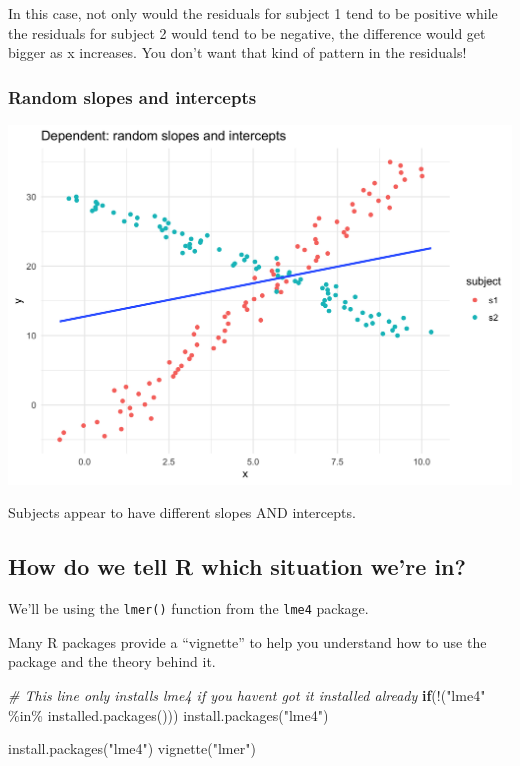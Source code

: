 \documentclass[
  openany]{book}
\newenvironment{Shaded}{\begin{snugshade}}{\end{snugshade}}
\newcommand{\CommentTok}[1]{\textcolor[rgb]{0.56,0.35,0.01}{\textit{#1}}}
\newcommand{\ControlFlowTok}[1]{\textcolor[rgb]{0.13,0.29,0.53}{\textbf{#1}}}
\newcommand{\FunctionTok}[1]{\textcolor[rgb]{0.00,0.00,0.00}{#1}}
\newcommand{\NormalTok}[1]{#1}
\newcommand{\SpecialCharTok}[1]{\textcolor[rgb]{0.00,0.00,0.00}{#1}}
\newcommand{\StringTok}[1]{\textcolor[rgb]{0.31,0.60,0.02}{#1}}
\begin{document}
In this case, not only would the residuals for subject 1 tend to be positive while the residuals for subject 2 would tend to be negative, the difference would get bigger as x increases. You don't want that kind of pattern in the residuals!

\hypertarget{random-slopes-and-intercepts}{%
\subsubsection{Random slopes and intercepts}\label{random-slopes-and-intercepts}}

\begin{center}\includegraphics[width=1\linewidth]{images/m3/rand_slope_int} \end{center}

Subjects appear to have different slopes AND intercepts.

\hypertarget{how-do-we-tell-r-which-situation-were-in}{%
\subsection{How do we tell R which situation we're in?}\label{how-do-we-tell-r-which-situation-were-in}}

We'll be using the \texttt{lmer()} function from the \texttt{lme4} package.

Many R packages provide a ``vignette'' to help you understand how to use the package and the theory behind it.

\begin{Shaded}
\begin{Highlighting}[]
\CommentTok{\# This line only installs lme4 if you haven\textquotesingle{}t got it installed already}
\ControlFlowTok{if}\NormalTok{(}\SpecialCharTok{!}\NormalTok{(}\StringTok{"lme4"} \SpecialCharTok{\%in\%} \FunctionTok{installed.packages}\NormalTok{())) }\FunctionTok{install.packages}\NormalTok{(}\StringTok{"lme4"}\NormalTok{)}

\FunctionTok{install.packages}\NormalTok{(}\StringTok{"lme4"}\NormalTok{)}
\FunctionTok{vignette}\NormalTok{(}\StringTok{"lmer"}\NormalTok{)}
\end{Highlighting}
\end{Shaded}
\end{document}
